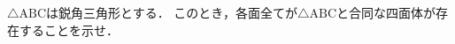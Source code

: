 \documentclass[../../main.tex]{subfiles}
\begin{document}
$\triangle \mathrm{ABC}$は鋭角三角形とする．
このとき，各面全てが$\triangle\mathrm{ABC}$と合同な四面体が存在することを示せ．
\end{document}
